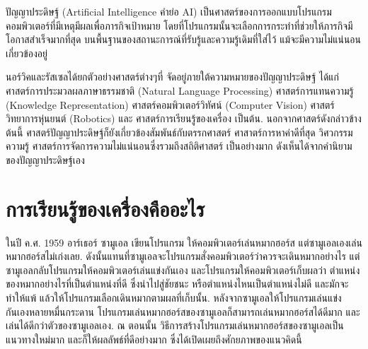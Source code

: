{\small
\begin{shaded}
ปัญญาประดิษฐ์ (Artificial Intelligence คำย่อ AI)
เป็นศาสตร์ของการออกแบบโปรแกรมคอมพิวเตอร์ที่มีเหตุมีผลเพื่อภารกิจเป้าหมาย
โดยที่โปรแกรมนั้นจะเลือกการกระทำที่ช่วยให้ภารกิจมีโอกาสสำเร็จมากที่สุด 
บนพื้นฐานของสถานะการณ์ที่รับรู้และความรู้เดิมที่ใส่ไว้
แม้จะมีความไม่แน่นอนเกี่ยวข้องอยู่
%

นอร์วิคและรัสเซล\cite{RussellNorvig2009a}ได้ยกตัวอย่างศาสตร์ต่างๆที่
จัดอยู่ภายใต้ความหมายของปัญญาประดิษฐ์ ได้แก่
ศาสตร์การประมวลผลภาษาธรรมชาติ (Natural Language Processing) %
ศาสตร์การแทนความรู้ (Knowledge Representation) %
ศาสตร์คอมพิวเตอร์วิทัศน์ (Computer Vision)
ศาสตร์วิทยาการหุ่นยนต์ (Robotics)
และ
ศาสตร์การเรียนรู้ของเครื่อง เป็นต้น.
%
นอกจากศาสตร์ดังกล่าวข้างต้นนี้ ศาสตร์ปัญญาประดิษฐ์ก็ยังเกี่ยวข้องสัมพันธ์กับตรรกศาสตร์ ศาสาตร์การหาค่าดีที่สุด  วิศวกรรมความรู้ ศาสตร์การจัดการความไม่แน่นอนซึ่งรวมถึงสถิติศาสตร์ เป็นอย่างมาก ดังเห็นได้จากคำนิยามของปัญญาประดิษฐ์เอง
\end{shaded}
}


\section{การเรียนรู้ของเครื่องคืออะไร}

ในปี ค.ศ. 1959 อาร์เธอร์ ซามูเอล %
เขียนโปรแกรม ให้คอมพิวเตอร์เล่นหมากฮอร์ส\cite{SamuelML} 
แต่ซามูเอลเองเล่นหมากฮอร์สไม่เก่งเลย.
ดังนั้นแทนที่ซามูเอลจะโปรแกรมสั่งคอมพิวเตอร์ว่าควรจะเดินหมากอย่างไร
แต่ซามูเอลกลับโปรแกรมให้คอมพิวเตอร์เล่นแข่งกันเอง และโปรแกรมให้คอมพิวเตอร์เก็บผลว่า
ตำแหน่งของหมากอย่างไรที่เป็นตำแหน่งที่ดี ซึ่งนำไปสู่ชัยชนะ 
หรือตำแหน่งไหนเป็นตำแหน่งไม่ดี และมักจะทำให้แพ้ 
แล้วให้โปรแกรมเลือกเดินหมากตามผลที่เก็บนั้น.
หลังจากซามูเอลให้โปรแกรมเล่นแข่งกันเองหลายหมื่นกระดาน โปรแกรมเล่นหมากฮอร์สของซามูเอลก็สามารถเล่นหมากฮอร์สได้ดีมาก 
และเล่นได้ดีกว่าตัวของซามูเอลเอง.
ณ ตอนนั้น วิธีการสร้างโปรแกรมเล่นหมากฮอร์สของซามูเอลเป็นแนวทางใหม่มาก 
และก็ให้ผลลัพธ์ที่ดีอย่างมาก ซึ่งได้เปิดเผยถึงศักยภาพของแนวคิดนี้

